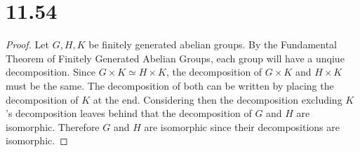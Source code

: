 \documentclass[12pt]{extarticle}
\begin{document}
\section*{11.54}
\begin{proof}
	Let $G,H, K$ be finitely generated abelian groups. By the Fundamental Theorem of Finitely Generated Abelian Groups, each group will have a unqiue decomposition. Since $G\times K \simeq H\times K$, the decomposition of $G\times K$ and $H\times K$ must be the same. The decomposition of both can be written by placing the decomposition of $K$ at the end. Considering then the decomposition excluding $K$'s decomposition leaves behind that the decomposition of $G$ and $H$ are isomorphic. Therefore $G$ and $H$ are isomorphic since their decompositions are isomorphic. 
\end{proof}
\end{document}
